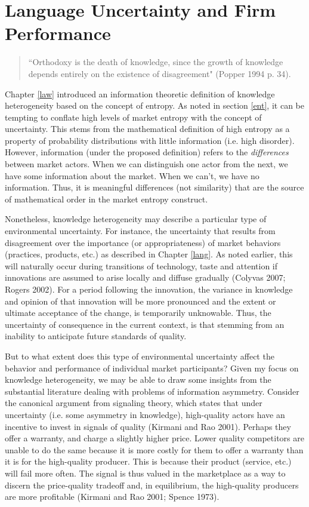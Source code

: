 \chapter{Language Uncertainty and Firm Performance \label{signal}}


\begin{small}
\begin{quote}
``Orthodoxy is the death of knowledge, since the growth of knowledge depends entirely on the existence of disagreement" (Popper 1994 p. 34).
\end{quote}
\end{small}

Chapter \ref{law} introduced an information theoretic definition of knowledge heterogeneity based on the concept of entropy. As noted in section \ref{ent}, it can be tempting to conflate high levels of market entropy with the concept of uncertainty. This stems from the mathematical definition of high entropy as a property of probability distributions with little information (i.e. high disorder). However, information (under the proposed definition) refers to the \emph{differences} between market actors. When we can distinguish one actor from the next, we have some information about the market. When we can't, we have no information. Thus, it is meaningful differences (not similarity) that are the source of mathematical order in the market entropy construct. 

Nonetheless, knowledge heterogeneity may describe a particular type of environmental uncertainty. For instance, the uncertainty that results from disagreement over the importance (or appropriateness) of market behaviors (practices, products, etc.) as described in Chapter \ref{lang}. As noted earlier, this will naturally occur during transitions of technology, taste and attention if innovations are assumed to arise locally and diffuse gradually (Colyvas 2007; Rogers 2002). For a period following the innovation, the variance in knowledge and opinion of that innovation will be more pronounced and the extent or ultimate acceptance of the change, is temporarily unknowable. Thus, the uncertainty of consequence in the current context, is that stemming from an inability to anticipate future standards of quality.

But to what extent does this type of environmental uncertainty affect the behavior and performance of individual market participants? Given my focus on knowledge heterogeneity, we may be able to draw some insights from the substantial literature dealing with problems of information asymmetry. Consider the canonical argument from signaling theory, which states that under uncertainty (i.e. some asymmetry in knowledge), high-quality actors have an incentive to invest in signals of quality (Kirmani and Rao 2001). Perhaps they offer a warranty, and charge a slightly higher price. Lower quality competitors are unable to do the same because it is more costly for them to offer a warranty than it is for the high-quality producer. This is because their product (service, etc.) will fail more often. The signal is thus valued in the marketplace as a way to discern the price-quality tradeoff and, in equilibrium, the high-quality producers are more profitable (Kirmani and Rao 2001; Spence 1973).

